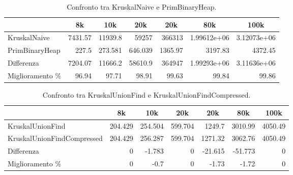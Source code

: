 \begin{table}[h!]
\centering 
    \begin{tabular}{|l|rrrrrr|}
    \hline
    &  \multicolumn{1}{c}{8k} & \multicolumn{1}{c}{10k} & \multicolumn{1}{c}{20k} & \multicolumn{1}{c}{20k} & \multicolumn{1}{c}{80k} &           \multicolumn{1}{c|}{100k} \\
    \hline
     KruskalNaive   & 7431.57 & 11939.8   & 59257     & 366313    &    1.99612e+06 &    3.12073e+06 \\
     PrimBinaryHeap &  227.5  &   273.581 &   646.039 &   1365.97 & 3197.83        & 4372.45        \\ \hline 
     Differenza     & 7204.07 & 11666.2   & 58610.9   & 364947    &    1.99293e+06 &    3.11636e+06 \\
     Miglioramento \%  &   96.94 &    97.71  &    98.91  &     99.63 &   99.84        &   99.86        \\
    \hline
    \end{tabular}
    \caption{Confronto tra KruskalNaive e PrimBinaryHeap.}
    \label{table:kruskal-naive-vs-prim-binary-heap}
\end{table}

\begin{table}[h!]
\centering 
    \hspace*{-0.25cm}
    \begin{tabular}{|l|rrrrrr|}
    \hline
    &  \multicolumn{1}{c}{8k} & \multicolumn{1}{c}{10k} & \multicolumn{1}{c}{20k} & \multicolumn{1}{c}{20k} & \multicolumn{1}{c}{80k} &           \multicolumn{1}{c|}{100k} \\
    \hline
     KruskalUnionFind           & 204.429 & 254.504 & 599.704 & 1249.7   & 3010.99  & 4050.49 \\
     KruskalUnionFindCompressed & 204.429 & 256.287 & 599.704 & 1271.32  & 3062.76  & 4050.49 \\ \hline 
     Differenza                 &   0     &  -1.783 &   0     &  -21.615 &  -51.773 &    0    \\
     Miglioramento \%              &   0     &  -0.7   &   0     &   -1.73  &   -1.72  &    0    \\
    \hline
    \end{tabular}
    \caption{Confronto tra KruskalUnionFind e KruskalUnionFindCompressed.}
    \label{table:kruskal-union-find-vs-kruskal-union-find-compressed}
\end{table}

